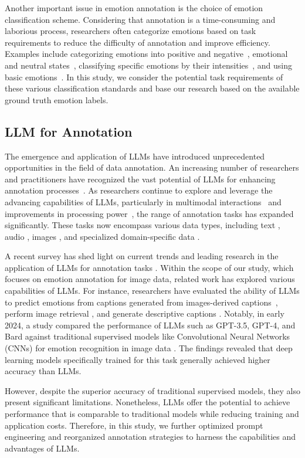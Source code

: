 Another important issue in emotion annotation is the choice of emotion classification scheme. Considering that annotation is a time-consuming and laborious process, researchers often categorize emotions based on task requirements to reduce the difficulty of annotation and improve efficiency. Examples include categorizing emotions into positive and negative~\cite{1034632}, emotional and neutral states~\cite{batliner2003find}, classifying specific emotions by their intensities~\cite{10494076}, and using basic emotions~\cite{10.1145/3629606.3629646,5585726}. In this study, we consider the potential task requirements of these various classification standards and base our research based on the available ground truth emotion labels.


\subsection{LLM for Annotation}

The emergence and application of LLMs have introduced unprecedented opportunities in the field of data annotation. An increasing number of researchers and practitioners have recognized the vast potential of LLMs for enhancing annotation processes~\cite{pmlr-v239-mohta23a}. As researchers continue to explore and leverage the advancing capabilities of LLMs, particularly in multimodal interactions~\cite{zhang2024mmllmsrecentadvancesmultimodal} and improvements in processing power~\cite{10.1145/3442188.3445922}, the range of annotation tasks has expanded significantly. These tasks now encompass various data types, including text \cite{10.1145/3637528.3671552}, audio \cite{10447760}, images \cite{cheng2024emotion, sapkota2024zero}, and specialized domain-specific data \cite{tang2024pdfchatannotator, zhang2024qualitativeresearchmeetslarge}.

A recent survey has shed light on current trends and leading research in the application of LLMs for annotation tasks \cite{tan-etal-2024-large}. Within the scope of our study, which focuses on emotion annotation for image data, related work has explored various capabilities of LLMs. For instance, researchers have evaluated the ability of LLMs to predict emotions from captions generated from images-derived captions~\cite{10388198}, perform image retrieval \cite{10.1145/3626772.3657740}, and generate descriptive captions \cite{shvetsova2025howtocaption}. Notably, in early 2024, a study compared the performance of LLMs such as GPT-3.5, GPT-4, and Bard against traditional supervised models like Convolutional Neural Networks (CNNs) for emotion recognition in image data \cite{nadeem2024vision}. The findings revealed that deep learning models specifically trained for this task generally achieved higher accuracy than LLMs.

However, despite the superior accuracy of traditional supervised models, they also present significant limitations. Nonetheless, LLMs offer the potential to achieve performance that is comparable to traditional models while reducing training and application costs. Therefore, in this study, we further optimized prompt engineering and reorganized annotation strategies to harness the capabilities and advantages of LLMs. 

%